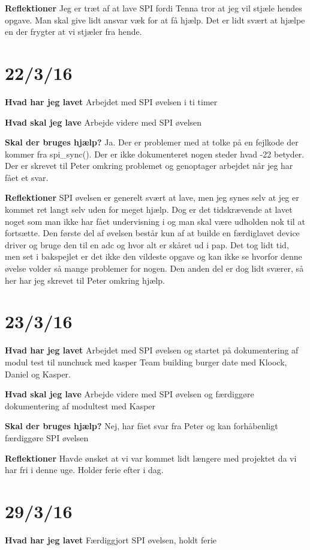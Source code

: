 \documentclass{article}
\begin{document}
	\textbf{Reflektioner}
	Jeg er træt af at lave SPI fordi Tenna tror at jeg vil stjæle hendes opgave. Man skal give lidt ansvar væk for at få hjælp. Det er lidt svært at hjælpe en der frygter at vi stjæler fra hende. 
	
	\section{22/3/16}
	\textbf{Hvad har jeg lavet}
	Arbejdet med SPI øvelsen i ti timer
	
	\textbf{Hvad skal jeg lave}
	Arbejde videre med SPI øvelsen
	
	\textbf{Skal der bruges hjælp?}
	Ja. Der er problemer med at tolke på en fejlkode der kommer fra spi\_sync(). Der er ikke dokumenteret nogen steder hvad -22 betyder.
	Der er skrevet til Peter omkring problemet og genoptager arbejdet når jeg har fået et svar.
	
	\textbf{Reflektioner}
	SPI øvelsen er generelt svært at lave, men jeg synes selv at jeg er kommet ret langt selv uden for meget hjælp. Dog er det tidskrævende at lavet noget som man ikke har fået undervisning i og man skal være udholden nok til at fortsætte. Den første del af øvelsen består kun af at builde en færdiglavet device driver og bruge den til en adc og hvor alt er skåret ud i pap. Det tog lidt tid, men set i bakspejlet er det ikke den vildeste opgave og kan ikke se hvorfor denne øvelse volder så mange problemer for nogen. Den anden del er dog lidt sværer, så her har jeg skrevet til Peter omkring hjælp. 
	
	\section{23/3/16}
	\textbf{Hvad har jeg lavet}
	Arbejdet med SPI øvelsen og startet på dokumentering af modul test til nunchuck med kasper
	Team building burger date med Kloock, Daniel og Kasper.
	
	\textbf{Hvad skal jeg lave}
	Arbejde videre med SPI øvelsen og færdiggøre dokumentering af modultest med Kasper
	
	\textbf{Skal der bruges hjælp?}
	Nej, har fået svar fra Peter og kan forhåbenligt færdiggøre SPI øvelsen
	
	\textbf{Reflektioner}
	Havde ønsket at vi var kommet lidt længere med projektet da vi har fri i denne uge. Holder ferie efter i dag.
	
	
	\section{29/3/16}
	\textbf{Hvad har jeg lavet}
	Færdiggjort SPI øvelsen, holdt ferie
	
\end{document}
